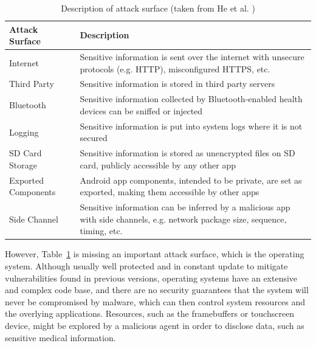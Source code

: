 \begin{table}[t]
	\caption {Description of attack surface (taken from He et al. \cite{he2014security})}
	\label{tab:attacksurfaces}
	\begin{tabular}{|>{\raggedright}p{2cm}|>{\raggedright\arraybackslash}p{10cm}|}
		\hline
		\textbf{Attack Surface}      & \textbf{Description}                                                                                                                    \\ \hline
		Internet            & Sensitive information is sent over the internet with unsecure protocols (e.g. HTTP), misconfigured HTTPS, etc.                 \\ \hline
		Third Party         & Sensitive information is stored in third party servers                                                                         \\ \hline
		Bluetooth           & Sensitive information collected by Bluetooth-enabled health devices can be sniffed or injected                                 \\ \hline
		Logging             & Sensitive information is put into system logs where it is not secured                                                          \\ \hline
		SD Card Storage     & Sensitive information is stored as unencrypted files on SD card, publicly accessible by any other app                          \\ \hline
		Exported Components &  Android app components, intended to be private, are set as exported, making them accessible by other apps                     \\ \hline
		Side Channel        & Sensitive information can be inferred by a malicious app with side channels, e.g. network package size, sequence, timing, etc. \\ \hline
	\end{tabular}
\end{table}

However, Table~\ref{tab:attacksurfaces} is missing an important attack surface, which is the operating system. Although usually well protected and in constant update to mitigate vulnerabilities found in previous versions, operating systems have an extensive and complex code base, and there are no security guarantees that the system will never be compromised by malware, which can then control system resources and the overlying applications. Resources, such as the framebuffers or touchscreen device, might be explored by a malicious agent in order to disclose data, such as sensitive medical information.

